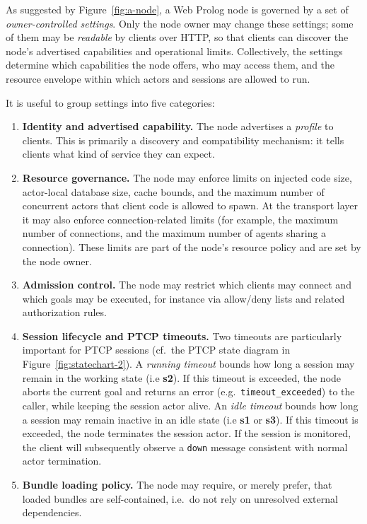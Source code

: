 As suggested by Figure~\ref{fig:a-node}, a Web Prolog node is governed by a set of \emph{owner-controlled settings}. Only the node owner may change these settings; some of them may be \emph{readable} by clients over HTTP, so that clients can discover the node's advertised capabilities and operational limits. Collectively, the settings determine which capabilities the node offers, who may access them, and the resource envelope within which actors and sessions are allowed to run.

It is useful to group settings into five categories:

\begin{enumerate}
\item \textbf{Identity and advertised capability.} The node advertises a \textit{profile} to clients. This is primarily a discovery and compatibility mechanism: it tells clients what kind of service they can expect.

\item \textbf{Resource governance.} The node may enforce limits on injected code size, actor-local database size, cache bounds, and the maximum number of concurrent actors that client code is allowed to spawn. At the transport layer it may also enforce connection-related limits (for example, the maximum number of connections, and the maximum number of agents sharing a connection). These limits are part of the node's resource policy and are set by the node owner.

\item \textbf{Admission control.} The node may restrict which clients may connect and which goals may be executed, for instance via allow/deny lists and related authorization rules.

\item \textbf{Session lifecycle and PTCP timeouts.} Two timeouts are particularly important for PTCP sessions (cf.\ the PTCP state diagram in Figure~\ref{fig:statechart-2}). A \emph{running timeout} bounds how long a session may remain in the working state (i.e \textbf{s2}). If this timeout is exceeded, the node aborts the current goal and returns an error (e.g.\ \texttt{timeout\_exceeded}) to the caller, while keeping the session actor alive. An \emph{idle timeout} bounds how long a session may remain inactive in an idle state (i.e \textbf{s1} or \textbf{s3}). If this timeout is exceeded, the node terminates the session actor. If the session is monitored, the client will subsequently observe a \texttt{down} message consistent with normal actor termination.

\item \textbf{Bundle loading policy.} The node may require, or merely prefer, that loaded bundles are self-contained, i.e.\ do not rely on unresolved external dependencies.
\end{enumerate}

